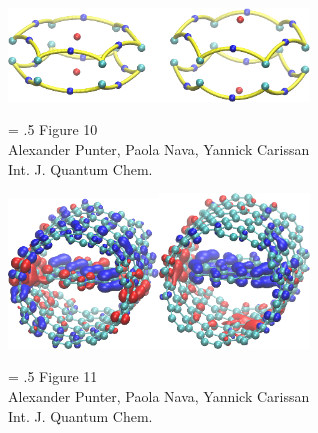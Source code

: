 \documentclass[12pt]{article}
\begin{document}
\begin{figure}
\begin{center}
\includegraphics[width=8cm]{aim_c6h6.eps}
\end{center}
{\Large
\begin{minipage}[t]{3in}
\baselineskip = .5\baselineskip
Figure 10 \\
Alexander Punter, Paola Nava, Yannick Carissan\\
Int. J. Quantum Chem.
\end{minipage}
}
\end{figure}

\clearpage

\begin{figure}
\begin{center}
\includegraphics[width=4cm]{trans_55_crop.eps}\includegraphics[width=4cm]{trans_59_crop.eps}
\end{center}
{\Large
\begin{minipage}[t]{3in}
\baselineskip = .5\baselineskip
Figure 11 \\
Alexander Punter, Paola Nava, Yannick Carissan\\
Int. J. Quantum Chem.
\end{minipage}
}
\end{figure}

\clearpage
\end{document}
